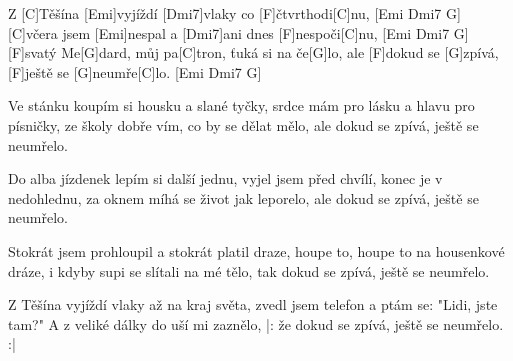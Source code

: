 
\sloka
Z [C]Těšína [Emi]vyjíždí [Dmi7]vlaky co [F]čtvrthodi[C]nu, [Emi Dmi7 G]
[C]včera jsem [Emi]nespal a [Dmi7]ani dnes [F]nespoči[C]nu, [Emi Dmi7 G]
[F]svatý Me[G]dard, můj pa[C]tron, ťuká si na če[G]lo,
ale [F]dokud se [G]zpívá, [F]ještě se [G]neumře[C]lo. [Emi Dmi7 G]

\sloka
Ve stánku koupím si housku a slané tyčky,
srdce mám pro lásku a hlavu pro písničky,
ze školy dobře vím, co by se dělat mělo,
ale dokud se zpívá, ještě se neumřelo.

\sloka
Do alba jízdenek lepím si další jednu,
vyjel jsem před chvílí, konec je v nedohlednu,
za oknem míhá se život jak leporelo,
ale dokud se zpívá, ještě se neumřelo.

\sloka
Stokrát jsem prohloupil a stokrát platil draze,
houpe to, houpe to na housenkové dráze,
i kdyby supi se slítali na mé tělo,
tak dokud se zpívá, ještě se neumřelo.

\sloka
Z Těšína vyjíždí vlaky až na kraj světa,
zvedl jsem telefon a ptám se: "Lidi, jste tam?"
A z veliké dálky do uší mi zaznělo,
|: že dokud se zpívá, ještě se neumřelo. :|

